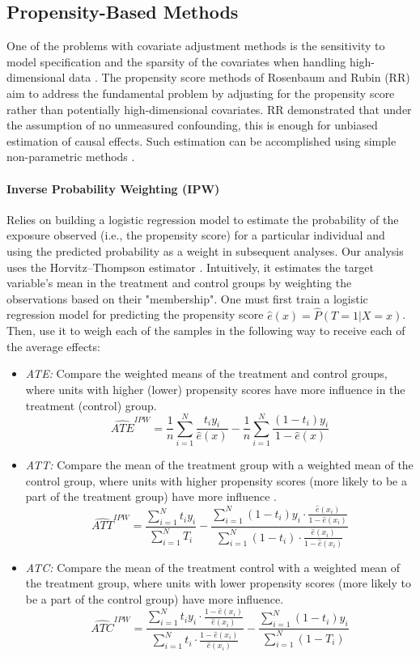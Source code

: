 \documentclass{article}
\begin{document}
\subsection{Propensity-Based Methods}

One of the problems with covariate adjustment methods is the sensitivity to model specification and the sparsity of the covariates when handling high-dimensional data \citep{zhao2020propensity}. The propensity score methods of Rosenbaum and Rubin (RR) aim to address the fundamental problem by adjusting for the propensity score rather than potentially high-dimensional covariates. RR demonstrated that under the assumption of no unmeasured confounding, this is enough for unbiased estimation of causal effects. Such estimation can be accomplished using simple non-parametric methods \citep{abdia2017propensity}.

\paragraph{Inverse Probability Weighting (IPW)} Relies on building a logistic regression model to estimate the probability of the exposure observed (i.e., the propensity score) for a particular individual and using the predicted probability as a weight in subsequent analyses. Our analysis uses the Horvitz–Thompson estimator \citep{horvitz1952generalization}. Intuitively, it estimates the target variable's mean in the treatment and control groups by weighting the observations based on their "membership". One must first train a logistic regression model for predicting the propensity score $\hat e(x) = \hat P(T=1 | X=x)$. Then, use it to weigh each of the samples in the following way to receive each of the average effects:

\begin{itemize}
    \item \textit{ATE:} Compare the weighted means of the treatment and control groups, where units with higher (lower) propensity scores have more influence in the treatment (control) group.
    \[
    \widehat{ATE}^{IPW} = \frac{1}{n}\sum_{i=1}^N \frac{t_i y_i}{\hat e(x)} - \frac{1}{n}\sum_{i=1}^N \frac{(1-t_i)y_i}{1-\hat e(x)}
    \]

    \item \textit{ATT:} Compare the mean of the treatment group with a weighted mean of the control group, where units with higher propensity scores (more likely to be a part of the treatment group) have more influence \citep{lechner2001identification}.
    \[
    \widehat{ATT}^{IPW} = \frac{\sum_{i=1}^N t_i y_i}{\sum_{i=1}^N T_i} - \frac{\sum_{i=1}^N (1-t_i)y_i \cdot \frac{\hat e(x_i)}{1- \hat e(x_i)}}{\sum_{i=1}^N (1-t_i) \cdot \frac{\hat e(x_i)}{1-\hat e(x_i)}}
    \]
    \item \textit{ATC:} Compare the mean of the treatment control with a weighted mean of the treatment group, where units with lower propensity scores (more likely to be a part of the control group) have more influence.
    \[
    \widehat{ATC}^{IPW} = \frac{\sum_{i=1}^N t_iy_i \cdot \frac{1-\hat e(x_i)}{\hat e(x_i)}}{\sum_{i=1}^N t_i \cdot \frac{1-\hat e(x_i)}{\hat e(x_i)}} - \frac{\sum_{i=1}^N (1-t_i)y_i}{\sum_{i=1}^N (1-T_i)}
    \]
\end{itemize}
\end{document}

